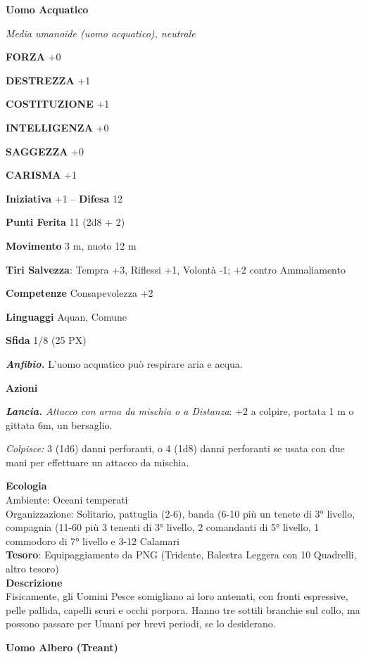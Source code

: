 \begin{multicols}{2}
	\medskip{}\textbf{Uomo Acquatico}

	\textit{Media umanoide (uomo acquatico), neutrale}

	\textbf{FORZA} +0

	\textbf{DESTREZZA} +1

	\textbf{COSTITUZIONE} +1

	\textbf{INTELLIGENZA} +0

	\textbf{SAGGEZZA} +0

	\textbf{CARISMA} +1

	\textbf{Iniziativa} +1 -- \textbf{Difesa} 12

	\textbf{Punti Ferita} 11 (2d8 + 2)

	\textbf{Movimento} 3 m, nuoto 12 m

	\textbf{Tiri Salvezza}: Tempra +3, Riflessi +1, Volontà -1; +2 contro Ammaliamento

	\textbf{Competenze} Consapevolezza +2

	\textbf{Linguaggi} Aquan, Comune

	\textbf{Sfida} 1/8 (25 PX)

	\textit{\textbf{Anfibio.}} L'uomo acquatico può respirare aria e acqua.

	\textbf{Azioni}

	\textit{\textbf{Lancia.} Attacco con arma da mischia o a Distanza}: +2 a colpire, portata 1 m o gittata 6m, un bersaglio.

	\textit{Colpisce:} 3 (1d6) danni perforanti, o 4 (1d8) danni perforanti se usata con due mani per effettuare un attacco da mischia.

	\textbf{Ecologia}\\
	Ambiente: Oceani temperati\\
	Organizzazione: Solitario, pattuglia (2-6), banda (6-10 più un tenete di 3° livello, compagnia (11-60 più 3 tenenti di 3° livello, 2 comandanti di 5° livello, 1 commodoro di 7° livello e 3-12 Calamari\\
	\textbf{Tesoro}: Equipaggiamento da PNG (Tridente, Balestra Leggera con 10 Quadrelli, altro tesoro)\\
	\textbf{Descrizione}\\
	Fisicamente, gli Uomini Pesce somigliano ai loro antenati, con fronti espressive, pelle pallida, capelli scuri e occhi porpora. Hanno tre sottili branchie sul collo, ma possono passare per Umani per brevi periodi, se lo desiderano.

	\medskip{}\textbf{Uomo Albero (Treant)}


\end{multicols}
